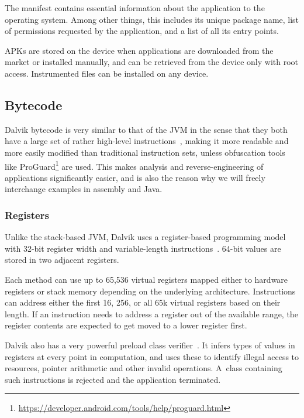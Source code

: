 \documentclass[12pt,twoside,notitlepage]{report}
\newcommand{\weblink}[1] {\footnote{\scriptsize\url{#1}}}
\begin{document}
The manifest contains essential information about the application to the operating system. Among other things, this includes its unique package name, list of permissions requested by the application, and a list of all its entry points.

APKs are stored on the device when applications are downloaded from the market or installed manually, and can be retrieved from the device only with root access. Instrumented files can be installed on any device. 

\subsection{Bytecode}

Dalvik bytecode is very similar to that of the JVM in the sense that they both have a large set of rather high-level instructions~\cite{web:DalvikBytecode, web:JavaBytecode}, making it more readable and more easily modified than traditional instruction sets, unless obfuscation tools like ProGuard\weblink{https://developer.android.com/tools/help/proguard.html} are used. This makes analysis and reverse-engineering of applications significantly easier, and is also the reason why we will freely interchange examples in assembly and Java.

\subsubsection{Registers}

Unlike the stack-based JVM, Dalvik uses a register-based programming model with 32-bit register width and variable-length instructions~\cite{web:DalvikInsnFormat}. 64-bit values are stored in two adjacent registers.

Each method can use up to 65,536 virtual registers mapped either to hardware registers or stack memory depending on the underlying architecture. 
Instructions can address either the first 16, 256, or all 65k virtual registers based on their length. If an instruction needs to address a register out of the available range, the register contents are expected to get moved to a lower register first.

Dalvik also has a very powerful preload class verifier~\cite{web:DalvikVerifier, web:DalvikDexopt}. It infers types of values in registers at every point in computation, and uses these to identify illegal access to resources, pointer arithmetic and other invalid operations. A~class containing such instructions is rejected and the application terminated.
\end{document}
